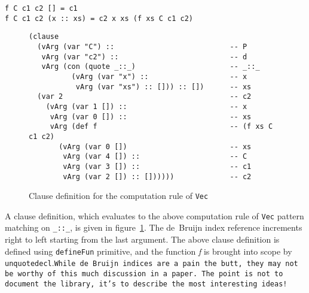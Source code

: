\documentclass[sigplan,10pt]{acmart}
\begin{document}
\begin{center}
\begingroup
\fontsize{7pt}{2pt}\selectfont
\begin{Verbatim}
f C c1 c2 [] = c1
f C c1 c2 (x :: xs) = c2 x xs (f xs C c1 c2)
\end{Verbatim}
\endgroup
\end{center}

\normalsize



\begin{figure}
\begin{center}
\begingroup
\fontsize{7pt}{9pt}\selectfont
\begin{Verbatim}[frame = single]
(clause
  (vArg (var "C") ::                           -- P
   vArg (var "c2") ::                          -- d
   vArg (con (quote _::_)                      -- _::_
          (vArg (var "x") ::                   -- x
           vArg (var "xs") :: [])) :: [])      -- xs
  (var 2                                       -- c2
    (vArg (var 1 []) ::                        -- x
     vArg (var 0 []) ::                        -- xs
     vArg (def f                               -- (f xs C c1 c2)
       (vArg (var 0 [])                        -- xs
        vArg (var 4 []) ::                     -- C
        vArg (var 3 []) ::                     -- c1
        vArg (var 2 []) :: [])))))             -- c2

\end{Verbatim}
\endgroup
\end{center}
\caption{Clause definition for the computation rule of \texttt{Vec}}
\label{fig:ast-cdef}
\end{figure}

\normalsize

A clause definition, which evaluates to the above computation rule of {\tt Vec} pattern matching on {\tt \_::\_}, is given in figure~\ref{fig:ast-cdef}. The de~Bruijn index reference increments right to left starting from the last argument.  The above clause definition is defined using {\tt defineFun} primitive, and the function \emph{f} is brought into scope by {\tt unquotedecl}.\texttt{While de~Bruijn indices are a pain the butt, they may not be worthy of this much discussion in a paper. The point is not to document the library, it's to describe the most interesting ideas!}
\end{document}
